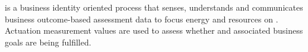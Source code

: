 %
%
\textbf{} is a business identity oriented
process that senses, understands and communicates business outcome-based assessment data to focus energy and
resources on .
Actuation measurement values are used to assess whether 
and associated business goals are being fulfilled.
